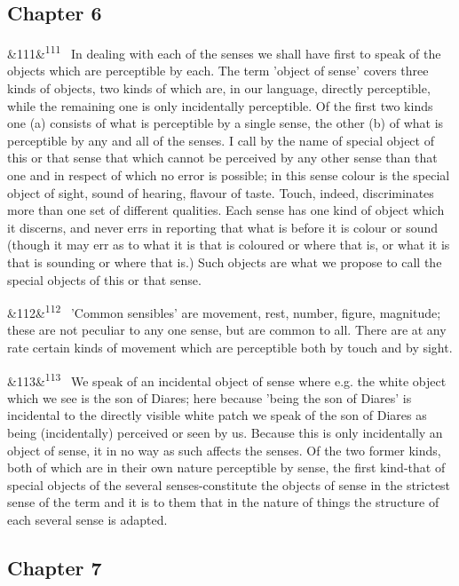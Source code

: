 \documentclass[12pt]{article}
\newcommand{\para}[1][]{\par\noindent\ifx&#1&\else\textsuperscript{\footnotesize #1}~\fi}
\begin{document}
\subsection*{Chapter 6}

\para[111] In dealing with each of the senses we shall have first to speak of the objects which are perceptible by each. The term 'object of sense' covers three kinds of objects, two kinds of which are, in our language, directly perceptible, while the remaining one is only incidentally perceptible. Of the first two kinds one (a) consists of what is perceptible by a single sense, the other (b) of what is perceptible by any and all of the senses. I call by the name of special object of this or that sense that which cannot be perceived by any other sense than that one and in respect of which no error is possible; in this sense colour is the special object of sight, sound of hearing, flavour of taste. Touch, indeed, discriminates more than one set of different qualities. Each sense has one kind of object which it discerns, and never errs in reporting that what is before it is colour or sound (though it may err as to what it is that is coloured or where that is, or what it is that is sounding or where that is.) Such objects are what we propose to call the special objects of this or that sense.

\para[112] 'Common sensibles' are movement, rest, number, figure, magnitude; these are not peculiar to any one sense, but are common to all. There are at any rate certain kinds of movement which are perceptible both by touch and by sight.

\para[113] We speak of an incidental object of sense where e.g. the white object which we see is the son of Diares; here because 'being the son of Diares' is incidental to the directly visible white patch we speak of the son of Diares as being (incidentally) perceived or seen by us. Because this is only incidentally an object of sense, it in no way as such affects the senses. Of the two former kinds, both of which are in their own nature perceptible by sense, the first kind-that of special objects of the several senses-constitute the objects of sense in the strictest sense of the term and it is to them that in the nature of things the structure of each several sense is adapted.

\subsection*{Chapter 7}
\end{document}

